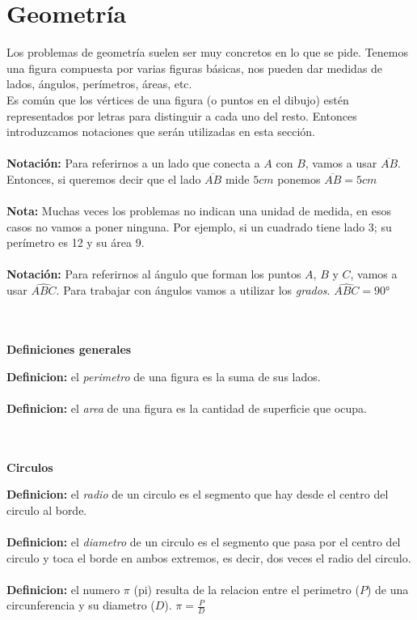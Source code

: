 \documentclass{article}
\begin{document}
\section{Geometría}
\begin{normalsize}
Los problemas de geometría suelen ser muy concretos en lo que se pide. Tenemos una figura compuesta por varias figuras básicas, nos pueden dar medidas de lados, ángulos, perímetros, áreas, etc.\\
Es común que los vértices de una figura (o puntos en el dibujo) estén representados por letras para distinguir a cada uno del resto. Entonces introduzcamos notaciones que serán utilizadas en esta sección.\\\\
\textbf{Notación:} Para referirnos a un lado que conecta a $A$ con $B$, vamos a usar $\overline{AB}$. Entonces, si queremos decir que el lado $\overline{AB}$ mide $5cm$ ponemos $\overline{AB}=5cm$\\\\
\textbf{Nota:} Muchas veces los problemas no indican una unidad de medida, en esos casos no vamos a poner ninguna. Por ejemplo, si un cuadrado tiene lado 3; su perímetro es 12 y su área 9.\\\\
\textbf{Notación:} Para referirnos al ángulo que forman los puntos $A$, $B$ y $C$, vamos a usar $\widehat{ABC}$. Para trabajar con ángulos vamos a utilizar los \textit{grados}. $\widehat{ABC}=90$°\\\\\\
\end{normalsize}
\begin{normalsize}
\begin{center}
\textbf{Definiciones generales}
\end{center}
\textbf{Definicion:} el \textit{perimetro} de una figura es la suma de sus lados.\\\\
\textbf{Definicion:} el \textit{area} de una figura es la cantidad de superficie que ocupa.\\\\\\
\begin{center}
\textbf{Circulos}
\end{center}
\textbf{Definicion:} el \textit{radio} de un circulo es el segmento que hay desde el centro del circulo al borde.\\\\
\textbf{Definicion:} el \textit{diametro} de un circulo es el segmento que pasa por el centro del circulo y toca el borde en ambos extremos, es decir, dos veces el radio del circulo.\\\\
\textbf{Definicion:} el numero $\pi$ (pi) resulta de la relacion entre el perimetro ($P$) de una circunferencia y su diametro ($D$). $\pi=\frac{P}{D}$\\\\
\end{normalsize}
\end{document}
